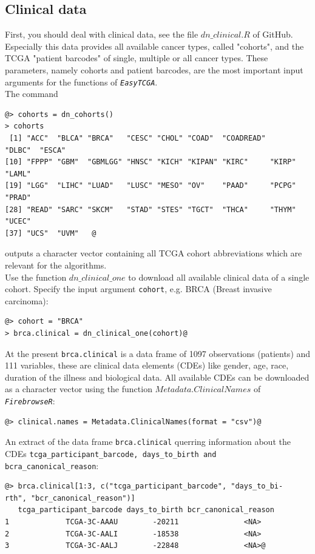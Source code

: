 \documentclass[a4paper,12pt,listof=totoc,bibliography=totoc]{scrartcl}
\begin{document}
\subsection{Clinical data}
First, you should deal with clinical data, see the file $dn\_clinical.R$ of GitHub. Especially this data provides all available cancer types, called "cohorts", 
and the TCGA  "patient barcodes"  of single, multiple or all cancer types. These parameters, namely cohorts and patient barcodes, are the most
important input arguments for the functions of \texttt{\em EasyTCGA}. \\
The command
\begin{lstlisting}[style=base]
@> cohorts = dn_cohorts()
> cohorts
 [1] "ACC"  "BLCA" "BRCA"   "CESC" "CHOL" "COAD"  "COADREAD" 
"DLBC"  "ESCA"    
[10] "FPPP" "GBM"  "GBMLGG" "HNSC" "KICH" "KIPAN" "KIRC"     "KIRP"  "LAML"    
[19] "LGG"  "LIHC" "LUAD"   "LUSC" "MESO" "OV"    "PAAD"     "PCPG"  "PRAD"    
[28] "READ" "SARC" "SKCM"   "STAD" "STES" "TGCT"  "THCA"     "THYM"  "UCEC"    
[37] "UCS"  "UVM"   @
\end{lstlisting}
outputs a character vector containing all TCGA cohort abbreviations which are relevant for the algorithms.\\
Use the function $dn\_clinical\_one$ to download all available clinical data of a single cohort. Specify the input argument {\tt cohort}, e.g. BRCA 
(Breast invasive carcinoma):  
\begin{lstlisting}[style=base]
@> cohort = "BRCA"
> brca.clinical = dn_clinical_one(cohort)@
\end{lstlisting}
At the present {\tt brca.clinical} is a data frame of 1097 observations (patients) and 111 variables, these are clinical data elements (CDEs) like 
gender, age, race, duration of the illness and biological data. All available CDEs can be downloaded as a character vector using the 
function $Metadata.ClinicalNames$ of \texttt{\em FirebrowseR}:
\begin{lstlisting}[style=base]
@> clinical.names = Metadata.ClinicalNames(format = "csv")@
\end{lstlisting}
An extract of the data frame {\tt brca.clinical} querring information about the CDEs {\tt tcga\_participant\_barcode, days\_to\_birth and bcra\_canonical\_reason}:
\begin{lstlisting}[style=base]
@> brca.clinical[1:3, c("tcga_participant_barcode", "days_to_bi-
rth", "bcr_canonical_reason")]
   tcga_participant_barcode days_to_birth bcr_canonical_reason
1             TCGA-3C-AAAU        -20211               <NA>
2             TCGA-3C-AALI        -18538               <NA>
3             TCGA-3C-AALJ        -22848               <NA>@
\end{lstlisting}
\end{document}

